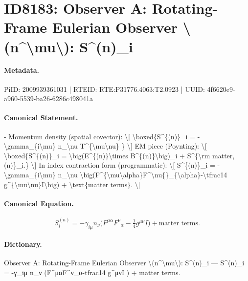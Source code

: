 \section*{ID8183: Observer A: Rotating-Frame Eulerian Observer \textbackslash{}(n\textasciicircum{}\textbackslash{}mu\textbackslash{}): S\textasciicircum{}(n)\_i}
\paragraph{Metadata.}
PiID: 2009939361031 | RTEID: RTE:P31776.4063:T2.0923 | UUID: 4f6620e9-a960-5539-ba26-6286c498041a

\paragraph{Canonical Statement.}
- Momentum density (spatial covector): \textbackslash{}[ \textbackslash{}boxed\{S\textasciicircum{}\{(n)\}\_i = -\textbackslash{}gamma\_\{i\textbackslash{}mu\} n\_\textbackslash{}nu T\textasciicircum{}\{\textbackslash{}mu\textbackslash{}nu\} \} \textbackslash{}] EM piece (Poynting): \textbackslash{}[ \textbackslash{}boxed\{S\textasciicircum{}\{(n)\}\_i = \textbackslash{}big(E\textasciicircum{}\{(n)\}\textbackslash{}times B\textasciicircum{}\{(n)\}\textbackslash{}big)\_i + S\textasciicircum{}\{\textbackslash{}rm matter,(n)\}\_i.\} \textbackslash{}] In index contraction form (programmatic): \textbackslash{}[ S\textasciicircum{}\{(n)\}\_i = -\textbackslash{}gamma\_\{i\textbackslash{}mu\} n\_\textbackslash{}nu \textbackslash{}big(F\textasciicircum{}\{\textbackslash{}mu\textbackslash{}alpha\}F\textasciicircum{}\textbackslash{}nu\{\}\_\{\textbackslash{}alpha\}-\textbackslash{}tfrac14 g\textasciicircum{}\{\textbackslash{}mu\textbackslash{}nu\}I\textbackslash{}big) + \textbackslash{}text\{matter terms\}. \textbackslash{}]

\paragraph{Canonical Equation.}
\[
S^{(n)}_i = -\gamma_{i\mu} n_\nu \big(F^{\mu\alpha}F^\nu{}_{\alpha}-\tfrac14 g^{\mu\nu}I\big) + \text{matter terms}.
\]

\paragraph{Dictionary.}
Observer A: Rotating-Frame Eulerian Observer \textbackslash{}(n\textasciicircum{}\textbackslash{}mu\textbackslash{}): S\textasciicircum{}(n)\_i — S\textasciicircum{}(n)\_i = -γ\_iμ n\_ν (F\textasciicircum{}μαF\textasciicircum{}ν\_α-tfrac14 g\textasciicircum{}μνI ) + matter terms.

